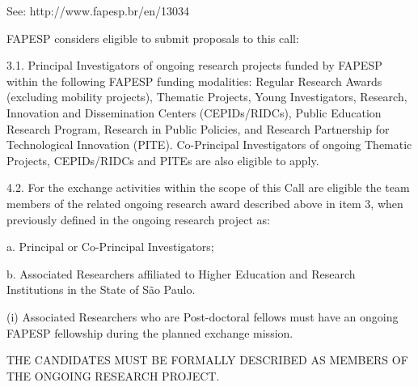 \documentclass[a4paper,10pt,epsfig,epsf,amsfonts,amsmath]{article}
\begin{document}
\begin{fapesp}
  See:  http://www.fapesp.br/en/13034
  
FAPESP considers eligible to submit proposals to this call:
  
3.1. Principal Investigators of ongoing research projects funded by FAPESP within the following FAPESP funding modalities: Regular Research Awards (excluding mobility projects), Thematic Projects, Young Investigators, Research, Innovation and Dissemination Centers (CEPIDs/RIDCs), Public Education Research Program, Research in Public Policies, and Research Partnership for Technological Innovation (PITE). Co-Principal Investigators of ongoing Thematic Projects, CEPIDs/RIDCs and PITEs are also eligible to apply.

4.2. For the exchange activities within the scope of this Call are eligible the team members of the related ongoing research award described above in item 3, when previously defined in the ongoing research project as:

a. Principal or Co-Principal Investigators;

b. Associated Researchers affiliated to Higher Education and Research Institutions in the State of São Paulo.

(i) Associated Researchers who are Post-doctoral fellows must have an ongoing FAPESP fellowship during the planned exchange mission.

THE CANDIDATES MUST BE FORMALLY DESCRIBED AS MEMBERS OF THE ONGOING RESEARCH PROJECT.
\end{fapesp}
\end{document}
